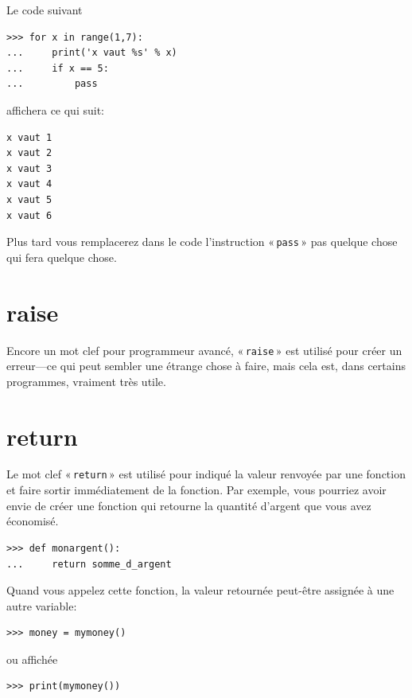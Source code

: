 Le code suivant
\begin{Verbatim}[frame=single,rulecolor=\color{gray}]
>>> for x in range(1,7):
...     print('x vaut %s' % x)
...     if x == 5:
...         pass
\end{Verbatim}

affichera ce qui suit:


\begin{Verbatim}[frame=single,rulecolor=\color{gray}]
x vaut 1
x vaut 2
x vaut 3
x vaut 4
x vaut 5
x vaut 6
\end{Verbatim}

Plus tard vous remplacerez dans le code l'instruction « \texttt{pass} » pas quelque chose qui fera quelque chose.



\section*{raise}

Encore un mot clef pour programmeur avancé, « \texttt{raise} » est utilisé pour créer un erreur---ce qui peut sembler une étrange chose à faire, mais cela est, dans certains programmes, vraiment très utile.

\section*{return}
Le mot clef « \texttt{return} » est utilisé pour indiqué la valeur renvoyée par une fonction et faire sortir immédiatement de la fonction. Par exemple, vous pourriez avoir envie de créer une fonction qui retourne la quantité d'argent que vous avez économisé.


\begin{Verbatim}[frame=single,rulecolor=\color{gray}]
>>> def monargent():
...     return somme_d_argent
\end{Verbatim}

Quand vous appelez cette fonction, la valeur retournée peut-être assignée à une autre variable:
\begin{Verbatim}[frame=single,rulecolor=\color{gray}]
>>> money = mymoney()
\end{Verbatim}

ou affichée

\begin{Verbatim}[frame=single,rulecolor=\color{gray}]
>>> print(mymoney())
\end{Verbatim}

